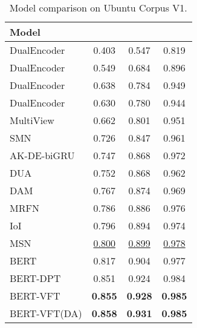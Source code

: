 \documentclass[a4paper]{article}
\begin{document}
\begin{table}[h]\centering
\begin{adjustbox}{width=0.45\textwidth}
\centering
\renewcommand{\arraystretch}{1.2}\begin{scriptsize}
\begin{tabular}{cccc}
\hline

\multicolumn{1}{l|}{\textbf{Model}}   &     &    &    \\
\hline
\multicolumn{1}{l|}{DualEncoder}     & 0.403    & 0.547  & 0.819 \\
\multicolumn{1}{l|}{DualEncoder}     & 0.549  & 0.684  & 0.896 \\
\multicolumn{1}{l|}{DualEncoder}    & 0.638    & 0.784  & 0.949 \\
\multicolumn{1}{l|}{DualEncoder}     & 0.630  & 0.780  & 0.944 \\
\hline

\multicolumn{1}{l|}{MultiView}     & 0.662    & 0.801  & 0.951 \\
\multicolumn{1}{l|}{SMN}     & 0.726  & 0.847    & 0.961  \\
\multicolumn{1}{l|}{AK-DE-biGRU}    & 0.747  & 0.868  & 0.972  \\
\multicolumn{1}{l|}{DUA}     & 0.752  & 0.868    & 0.962  \\ 
\multicolumn{1}{l|}{DAM}     & 0.767  & 0.874    & 0.969  \\ 
\multicolumn{1}{l|}{MRFN}     & 0.786  & 0.886   & 0.976\\ 
\multicolumn{1}{l|}{IoI}     & 0.796  & 0.894    & 0.974  \\ 
\multicolumn{1}{l|}{MSN}     & \underline{0.800}  & \underline{0.899}    & \underline{0.978}  \\

\hline
\hline
\multicolumn{1}{l|}{BERT}   & 0.817  & 0.904    & 0.977  \\ 
\multicolumn{1}{l|}{BERT-DPT} & 0.851  & 0.924  & 0.984 \\
\multicolumn{1}{l|}{BERT-VFT} & \textbf{0.855}  & \textbf{0.928}  & \textbf{0.985}  \\
\multicolumn{1}{l|}{BERT-VFT(DA)} & \textbf{0.858}  & \textbf{0.931} & \textbf{0.985 }\\
\hline
\end{tabular}
\end{scriptsize}
\end{adjustbox}
\caption{Model comparison on Ubuntu Corpus V1.}
\label{table:evaluation_results_ubuntu}
\vspace{-0.7cm}
\end{table}
\end{document}
